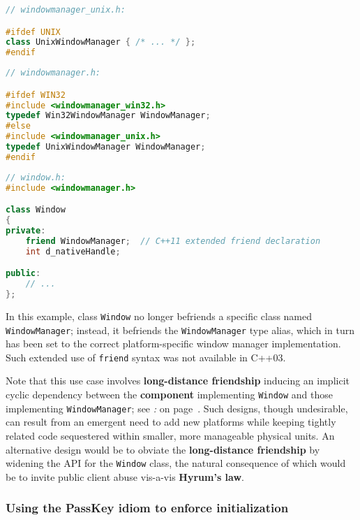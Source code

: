 \begin{lstlisting}[language=C++]
// windowmanager_unix.h:

#ifdef UNIX
class UnixWindowManager { /* ... */ };
#endif
\end{lstlisting}

\vspace*{2ex}

\begin{lstlisting}[language=C++]
// windowmanager.h:

#ifdef WIN32
#include <windowmanager_win32.h>
typedef Win32WindowManager WindowManager;
#else
#include <windowmanager_unix.h>
typedef UnixWindowManager WindowManager;
#endif
\end{lstlisting}

\vspace*{2ex}

\begin{lstlisting}[language=C++]
// window.h:
#include <windowmanager.h>

class Window
{
private:
    friend WindowManager;  // C++11 extended friend declaration
    int d_nativeHandle;

public:
    // ...
};
\end{lstlisting}


In this example, class \texttt{Window} no longer befriends a specific
class named \texttt{WindowManager}; instead, it befriends the
\texttt{WindowManager} type alias, which in turn has been set to the
correct platform-specific window manager implementation. Such extended
use of \texttt{friend} syntax was not available in C++03.

Note that this use case involves \textbf{long-distance friendship}
inducing an implicit cyclic dependency between the \textbf{component}
implementing \texttt{Window} and those implementing
\texttt{WindowManager}; see \textit{: } on page~\pageref{long-distance-friendship}. Such designs, though
undesirable, can result from an emergent need to add new platforms while
keeping tightly related code sequestered within smaller, more manageable
physical units. An alternative design would be to obviate the
\textbf{long-distance friendship} by widening the API for the
\texttt{Window} class, the natural consequence of which would be to
invite public client abuse vis-a-vis \textbf{Hyrum's law}.

\subsubsection[Using the {\tt PassKey} idiom to enforce initialization]{Using the {\SubsubsecCode PassKey} idiom to enforce initialization}\label{using-the-passkey-idiom-to-enforce-initialization}

